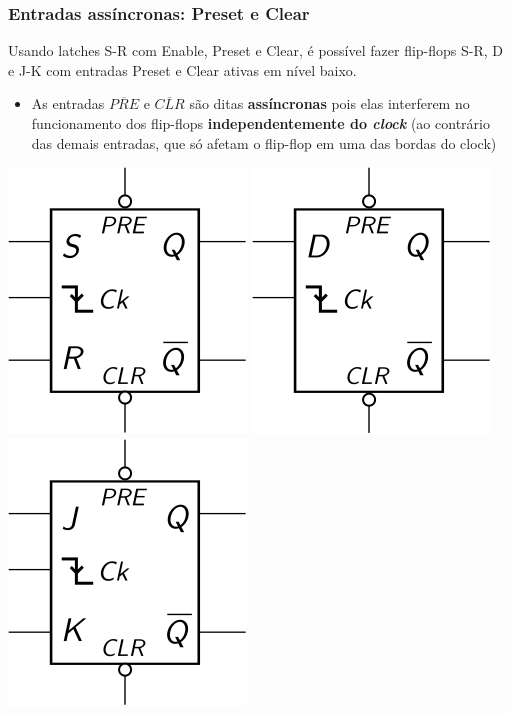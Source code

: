 \documentclass{beamer}
\newcommand{\Not}[1]{\overline{#1}}
\begin{document}
\begin{frame}
\frametitle{Entradas assíncronas: Preset e Clear}

Usando latches S-R com Enable, Preset e Clear, é possível fazer
flip-flops S-R, D e J-K com entradas Preset e Clear ativas em nível baixo.

\begin{itemize}
\item As entradas $\Not{PRE}$ e $\Not{CLR}$ são ditas
\textbf{assíncronas} pois elas interferem no funcionamento
dos flip-flops \textbf{independentemente do \emph{clock}}
(ao contrário das demais entradas, que só afetam o flip-flop
em uma das bordas do clock)
\end{itemize}

\hspace{2ex}
\includegraphics{images/flipflopRSPreClr_blackbox}
\hfill
\includegraphics{images/flipflopDPreClr_blackbox}
\hfill
\includegraphics{images/flipflopJKPreClr_blackbox}
\hspace{2ex}

\end{frame}
\end{document}
